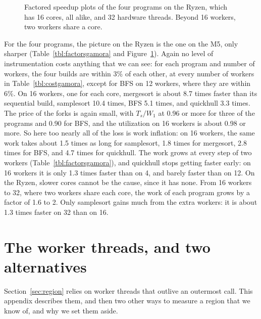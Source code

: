 \documentclass[sigplan,nonacm]{acmart}
\begin{document}
\begin{figure}
\centering
{}\hfill
{}\hfill
{}\hfill
{}

\smallskip
\factoredlegend
\caption{Factored speedup plots of the four programs on the Ryzen,
  which has 16 cores, all alike, and 32 hardware threads.
  Beyond 16 workers, two workers share a core.}
\label{fig:factoredgamora}
\end{figure}

For the four programs, the picture on the Ryzen is the one on the M5,
only sharper (Table~\ref{tbl:factorsgamora} and
Figure~\ref{fig:factoredgamora}).
%
Again no level of instrumentation costs anything that we can see: for
each program and number of workers, the four builds are within 3\% of
each other, at every number of workers in
Table~\ref{tbl:costgamora}, except for BFS on 12 workers, where they
are within 6\%.
%
On 16 workers, one for each core, mergesort is about 8.7 times faster
than its sequential build, samplesort 10.4 times, BFS 5.1 times, and
quickhull 3.3 times.
%
The price of the forks is again small, with $T_s/W_1$ at 0.96 or more
for three of the programs and 0.90 for BFS, and the utilization on 16
workers is about 0.98 or more.
%
So here too nearly all of the loss is work inflation: on 16 workers,
the same work takes about 1.5 times as long for samplesort, 1.8 times
for mergesort, 2.8 times for BFS, and 4.7 times for quickhull.
%
The work grows at every step of two workers
(Table~\ref{tbl:factorsgamora}), and quickhull stops getting faster
early: on 16 workers it is only 1.3 times faster than on 4, and
barely faster than on 12.
%
On the Ryzen, slower cores cannot be the cause, since it has none.
%
From 16 workers to 32, where two workers share each core, the work of
each program grows by a factor of 1.6 to 2.
%
Only samplesort gains much from the extra workers: it is about 1.3
times faster on 32 than on 16.


\section{The worker threads, and two alternatives}
\label{sec:pool}

Section~\ref{sec:region} relies on worker threads that outlive an
outermost call.
%
This appendix describes them, and then two other ways to measure a
region that we know of, and why we set them aside.
\end{document}
